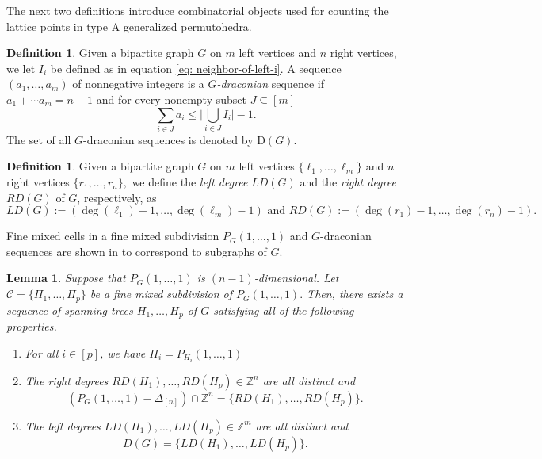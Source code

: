 \documentclass[12pt,reqno]{article}%
\newtheorem{lem}[thm]{Lemma}
\theoremstyle{definition}
\newtheorem{defn}[thm]{Definition}
\numberwithin{equation}{section}
\newcommand{\Z}{\mathbb Z}
\newcommand{\calC}{\mathcal{C}}
\begin{document}
The next two definitions introduce combinatorial objects used for counting the lattice points in type A generalized permutohedra.

\begin{defn}\label{def: G-draconian-type-A}
    Given a bipartite graph $G$ on $m$ left vertices and $n$ right vertices, we let $I_i$ be defined as in equation \eqref{eq: neighbor-of-left-i}. A sequence $(a_1, \dots, a_m)$ of nonnegative integers is a \emph{$G$-draconian} sequence if $a_1 + \cdots a_m = n-1$ and for every nonempty subset $J \subseteq [m]$
    \[\sum_{i \in J}a_i \leq \big| \bigcup_{i \in J} I_i\big| - 1.\]
    The set of all $G$-draconian sequences is denoted by $\mathrm{D}(G).$
\end{defn} 

\begin{defn}\label{def: left-right-degree}
    Given a bipartite graph $G$ on $m$ left vertices $\{\ell_1, \dots, \ell_m\}$ and $n$ right vertices $\{r_1, \dots, r_n\},$ we define the \emph{left degree} $LD(G)$ and the \emph{right degree} $RD(G)$ of $G$, respectively, as
\[LD(G) := (\deg(\ell_1)-1, \dots, \deg(\ell_m)-1) \text{ and } RD(G) := (\deg(r_1)-1, \dots, \deg(r_n)-1).\]
\end{defn}

Fine mixed cells in a fine mixed subdivision $P_G(1,\dots, 1)$ and $G$-draconian sequences are shown in \cite[Lemma 12.6, Lemma 12.8, and Theorem 12.9]{Postnikov2005} to correspond to subgraphs of $G.$

\begin{lem}\label{lem: fine-mixed-subdivision-trees}
    Suppose that $P_G(1,\dots, 1)$ is $(n-1)$-dimensional. Let $\calC = \{\Pi_1, \dots, \Pi_p\}$ be a fine mixed subdivision of $P_G(1, \dots, 1).$ Then, there exists a sequence of spanning trees $H_1, \dots, H_p$ of $G$ satisfying all of the following properties.
    \begin{enumerate}
        \item\label{itm: fine-mixed-cells-trees} For all $i \in [p]$, we have $\Pi_i = P_{H_i}(1, \dots, 1)$
        \item\label{itm: right-deg-lattice-point} The right degrees $RD(H_1),\dots, RD(H_p) \in \Z^n$ are all distinct and
        $$(P_G(1, \dots, 1) - \Delta_{[n]})\cap \Z^n = \{RD(H_1), \dots, RD(H_p)\}.$$
        \item\label{itm: left-deg-g-draconion} The left degrees $LD(H_1),\dots, LD(H_p) \in \Z^m$ are all distinct and 
        $$D(G) = \{LD(H_1), \dots, LD(H_p)\}.$$
    \end{enumerate}
\end{lem}
\end{document}
